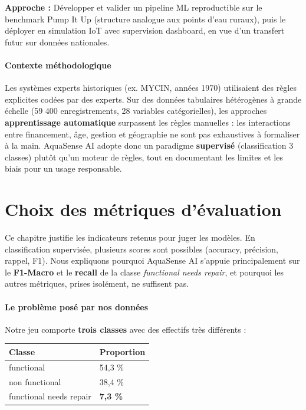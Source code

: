 \documentclass[11pt,a4paper]{report}
\begin{document}
\textbf{Approche :} Développer et valider un pipeline ML reproductible sur le benchmark Pump It Up (structure analogue aux points d'eau ruraux), puis le déployer en simulation IoT avec supervision dashboard, en vue d'un transfert futur sur données nationales.



\subsubsection{Contexte méthodologique}



Les systèmes experts historiques (ex. MYCIN, années 1970) utilisaient des règles explicites codées par des experts. Sur des données tabulaires hétérogènes à grande échelle (59 400 enregistrements, 28 variables catégorielles), les approches \textbf{apprentissage automatique} surpassent les règles manuelles : les interactions entre financement, âge, gestion et géographie ne sont pas exhaustives à formaliser à la main. AquaSense AI adopte donc un paradigme \textbf{supervisé} (classification 3 classes) plutôt qu'un moteur de règles, tout en documentant les limites et les biais pour un usage responsable.





\chapter{Choix des métriques d'évaluation}



Ce chapitre justifie les indicateurs retenus pour juger les modèles. En classification supervisée, plusieurs scores sont possibles (accuracy, précision, rappel, F1). Nous expliquons pourquoi AquaSense AI s'appuie principalement sur le \textbf{F1-Macro} et le \textbf{recall} de la classe \textit{functional needs repair}, et pourquoi les autres métriques, prises isolément, ne suffisent pas.



\subsubsection{Le problème posé par nos données}



Notre jeu comporte \textbf{trois classes} avec des effectifs très différents :



\begin{longtable}{@{}ll@{}}
\toprule
Classe & Proportion \\
\midrule
functional & 54,3 \% \\
non functional & 38,4 \% \\
functional needs repair & \textbf{7,3 \%} \\
\bottomrule
\end{longtable}
\end{document}
